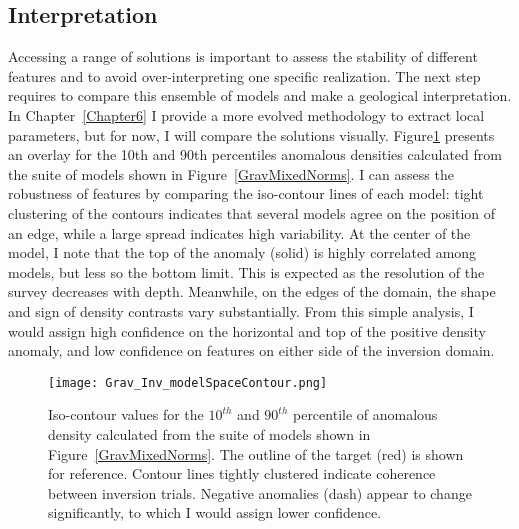 \subsection{Interpretation}
Accessing a range of solutions is important to assess the stability of different features and to avoid over-interpreting one specific realization. The next step requires to compare this ensemble of models and make a geological interpretation. In Chapter~\ref{Chapter6} I provide a more evolved methodology to extract local parameters, but for now, I will compare the solutions visually. Figure\ref{GravMixedNormContours} presents an overlay for the 10th and 90th percentiles anomalous densities calculated from the suite of models shown in Figure~\ref{GravMixedNorms}. I can assess the robustness of features by comparing the iso-contour lines of each model: tight clustering of the contours indicates that several models agree on the position of an edge, while a large spread indicates high variability. At the center of the model, I note that the top of the anomaly (solid) is highly correlated among models, but less so the bottom limit. This is expected as the resolution of the survey decreases with depth. Meanwhile, on the edges of the domain, the shape and sign of density contrasts vary substantially. From this simple analysis, I would assign high confidence on the horizontal and top of the positive density anomaly, and low confidence on features on either side of the inversion domain.
\begin{figure}
\texttt{[image: Grav\_Inv\_modelSpaceContour.png]}
\caption{Iso-contour values for the $10^{th}$ and $90^{th}$ percentile of anomalous density calculated from the suite of models shown in Figure~\ref{GravMixedNorms}. The outline of the target (red) is shown for reference. Contour lines tightly clustered indicate coherence between inversion trials. Negative anomalies (dash) appear to change significantly, to which I would assign lower confidence.
}
\label{GravMixedNormContours}
\end{figure}

